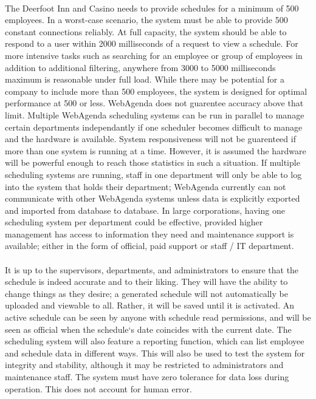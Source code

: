 \documentclass[letterpaper,12pt]{report}
\begin{document}
\paragraph*{}
\hspace{0.6cm}The Deerfoot Inn and Casino needs to provide schedules for a minimum of 500 employees. In a worst-case scenario, the system must be able to provide 500 constant connections reliably. At full capacity, the system should be able to respond to a user within 2000 milliseconds of a request to view a schedule. For more intensive tasks such as searching for an employee or group of employees in addition to additional filtering, anywhere from 3000 to 5000 milliseconds maximum is reasonable under full load. While there may be potential for a company to include more than 500 employees, the system is designed for optimal performance at 500 or less. WebAgenda does not guarentee accuracy above that limit. Multiple WebAgenda scheduling systems can be run in parallel to manage certain departments independantly if one scheduler becomes difficult to manage and the hardware is available. System responsiveness will not be guarenteed if more than one system is running at a time. However, it is assumed the hardware will be powerful enough to reach those statistics in such a situation. If multiple scheduling systems are running, staff in one department will only be able to log into the system that holds their department; WebAgenda currently can not communicate with other WebAgenda systems unless data is explicitly exported and imported from database to database. In large corporations, having one scheduling system per department could be effective, provided higher management has access to information they need and maintenance support is available; either in the form of official, paid support or staff / IT department.
\paragraph*{}\hspace{0.6cm}
It is up to the supervisors, departments, and administrators to ensure that the schedule is indeed accurate and to their liking. They will have the ability to change things as they desire; a generated schedule will not automatically be uploaded and viewable to all. Rather, it will be saved until it is activated. An active schedule can be seen by anyone with schedule read permissions, and will be seen as official when the schedule`s date coincides with the current date.
The scheduling system will also feature a reporting function, which can list employee and schedule data in different ways. This will also be used to test the system for integrity and stability, although it may be restricted to administrators and maintenance staff. The system must have zero tolerance for data loss during operation. This does not account for human error.
\end{document}
